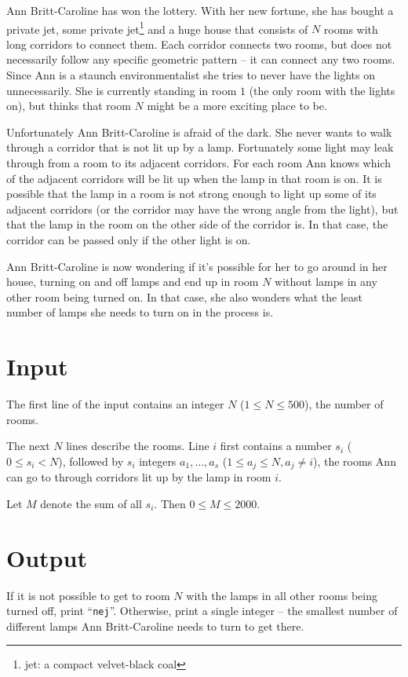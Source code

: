 \def\version{jury-3}
\noindent
Ann Britt-Caroline has won the lottery.
With her new fortune, she has bought a private jet, some private jet\footnote{jet: a compact velvet-black coal} and a huge house that consists of $N$ rooms with long corridors to connect them.
Each corridor connects two rooms, but does not necessarily follow any specific geometric pattern -- it can connect any two rooms.
Since Ann is a staunch environmentalist she tries to never have the lights on unnecessarily.
She is currently standing in room $1$ (the only room with the lights on), but thinks that room $N$ might be a more exciting place to be.

Unfortunately Ann Britt-Caroline is afraid of the dark.
She never wants to walk through a corridor that is not lit up by a lamp.
Fortunately some light may leak through from a room to its adjacent corridors.
For each room Ann knows which of the adjacent corridors will be lit up when the lamp in that room is on.
It is possible that the lamp in a room is not strong enough to light up some of its adjacent corridors (or the corridor may have the wrong angle from the light), but that the lamp in the room on the other side of the corridor is.
In that case, the corridor can be passed only if the other light is on.

Ann Britt-Caroline is now wondering if it's possible for her to go around in her house, turning on and off lamps and end up in room $N$ without lamps in any other room being turned on.
In that case, she also wonders what the least number of lamps she needs to turn on in the process is.

\section*{Input}
The first line of the input contains an integer $N$ ($1 \le N \le 500$), the number of rooms.

The next $N$ lines describe the rooms.
Line $i$ first contains a number $s_i$ ($0 \le s_i < N$), followed by $s_i$ integers $a_1, \dots, a_s$ ($1 \le a_j \le N, a_j \neq i$), the rooms Ann can go to through corridors lit up by the lamp in room $i$.

Let $M$ denote the sum of all $s_i$. Then $0 \le M \le 2000$.

\section*{Output}
If it is not possible to get to room $N$ with the lamps in all other rooms being turned off, print ``\texttt{nej}''.
Otherwise, print a single integer -- the smallest number of different lamps Ann Britt-Caroline needs to turn to get there.

